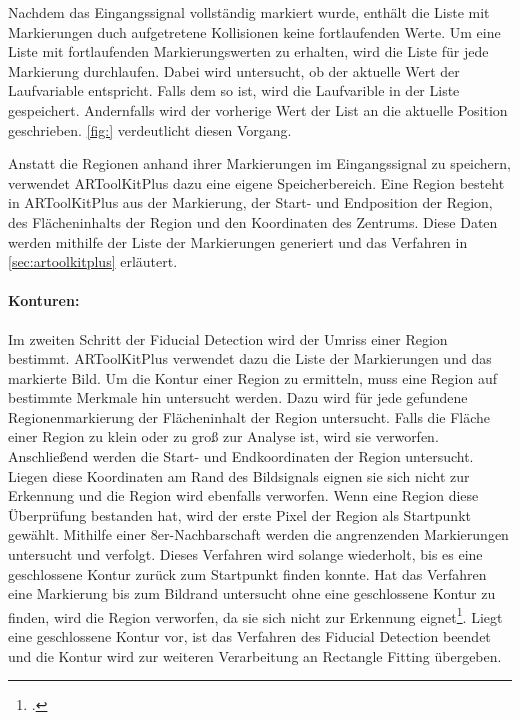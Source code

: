 Nachdem das Eingangssignal vollständig markiert wurde, enthält die Liste mit Markierungen duch aufgetretene Kollisionen
 keine fortlaufenden Werte. Um eine Liste mit fortlaufenden Markierungswerten zu erhalten, wird die Liste für jede
 Markierung durchlaufen. Dabei wird untersucht, ob der aktuelle Wert der Laufvariable entspricht. Falls dem so ist,
 wird die Laufvarible in der Liste gespeichert. Andernfalls wird der vorherige Wert der List an die aktuelle Position
 geschrieben. \autoref{fig:} verdeutlicht diesen Vorgang.

Anstatt die Regionen anhand ihrer Markierungen im Eingangssignal zu speichern, verwendet ARToolKitPlus dazu eine eigene
 Speicherbereich. Eine Region besteht in ARToolKitPlus aus der Markierung, der Start- und Endposition der Region, des
 Flächeninhalts der Region und den Koordinaten des Zentrums. Diese Daten werden mithilfe der Liste der Markierungen
 generiert und das Verfahren in \autoref{sec:artoolkitplus} erläutert.

\paragraph{Konturen:} %
\label{par:konturen}
Im zweiten Schritt der Fiducial Detection wird der Umriss einer Region bestimmt. ARToolKitPlus verwendet dazu die Liste
 der Markierungen und das markierte Bild. Um die Kontur einer Region zu ermitteln, muss eine Region auf bestimmte
 Merkmale hin untersucht werden. Dazu wird für jede gefundene Regionenmarkierung der Flächeninhalt der Region
 untersucht. Falls die Fläche einer Region zu klein oder zu groß zur Analyse ist, wird sie verworfen. Anschließend
 werden die Start- und Endkoordinaten der Region untersucht. Liegen diese Koordinaten am Rand des Bildsignals eignen
 sie sich nicht zur Erkennung und die Region wird ebenfalls verworfen. Wenn eine Region diese Überprüfung bestanden
 hat, wird der erste Pixel der Region als Startpunkt gewählt. Mithilfe einer 8er-Nachbarschaft werden die angrenzenden
 Markierungen untersucht und verfolgt. Dieses Verfahren wird solange wiederholt, bis es eine geschlossene Kontur zurück
 zum Startpunkt finden konnte. Hat das Verfahren eine Markierung bis zum Bildrand untersucht ohne eine geschlossene
 Kontur zu finden, wird die Region verworfen, da sie sich nicht zur Erkennung
 eignet\footcite[Vgl.][S.~41--42]{wagner07a}. Liegt eine geschlossene Kontur vor, ist das Verfahren des Fiducial
 Detection beendet und die Kontur wird zur weiteren Verarbeitung an Rectangle Fitting übergeben.

